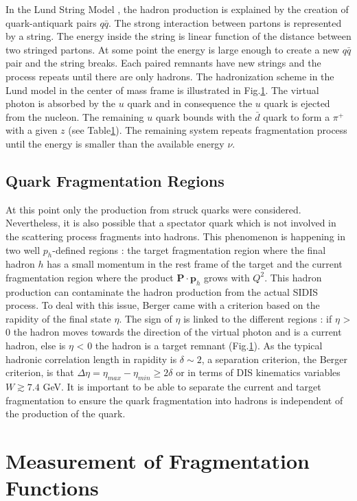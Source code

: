 In the Lund String Model \cite{}, the hadron production is explained by the creation of quark-antiquark pairs $q\bar{q}$. The strong interaction between
partons is represented by a string. The energy inside the string is linear function of the distance between two stringed partons. At some point the
energy is large enough to create a new $q\bar{q}$ pair and the string breaks. Each paired remnants have new strings and the process repeats until there
are only hadrons. The hadronization scheme in the Lund model in the center of mass frame is illustrated in Fig.\ref{}. The virtual photon is absorbed by
the $u$ quark and in consequence the $u$ quark is ejected from the nucleon. The remaining $u$ quark bounds with the $\bar{d}$ quark to form a $\pi^+$
with a given $z$ (see Table\ref{}). The remaining system repeats fragmentation process until the energy is smaller than the available energy $\nu$.

\subsection*{Quark Fragmentation Regions}

At this point only the production from struck quarks were considered. Nevertheless, it is also possible that a spectator quark which is not involved in
the scattering process fragments into hadrons. This phenomenon is happening in two well $p_h$-defined regions : the target fragmentation region where
the final hadron $h$ has a small momentum in the rest frame of the target and the current fragmentation region where the product $\textbf{P}\cdot\textbf{p}_h$
grows with $Q^2$. This hadron production can contaminate the hadron production from the actual SIDIS process. To deal with this issue, Berger \cite{} came
with a criterion based on the rapidity of the final state $\eta$. The sign of $\eta$ is linked to the different regions : if $\eta$ > 0 the hadron moves
towards the direction of the virtual photon and is a current hadron, else is $\eta$ < 0 the hadron is a target remnant (Fig.\ref{}). As the typical hadronic
correlation length in rapidity is $\delta \sim 2$, a separation criterion, the Berger criterion, is that $\Delta\eta = \eta_{max}-\eta_{min} \geq 2\delta$
or in terms of DIS kinematics variables $W \gtrsim 7.4$ GeV. It is important to be able to separate the current and target fragmentation to ensure the quark
fragmentation into hadrons is independent of the production of the quark.


\section{Measurement of Fragmentation Functions}

